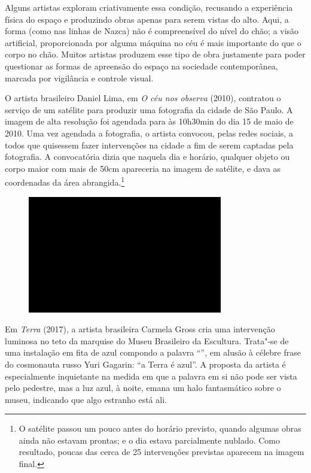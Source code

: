 Alguns artistas exploram criativamente essa condição, recusando a
experiência física do espaço e produzindo obras apenas para serem vistas
do alto. Aqui, a forma (como nas linhas de Nazca) não é compreensível do
nível do chão; a visão artificial, proporcionada por alguma máquina no
céu é mais importante do que o corpo no chão. Muitos artistas produzem
esse tipo de obra justamente para poder questionar as formas de
apreensão do espaço na sociedade contemporânea, marcada por vigilância e
controle visual.

O artista brasileiro Daniel Lima, em \emph{O céu nos observa} (2010),
contratou o serviço de um satélite para produzir uma fotografia da
cidade de São Paulo. A imagem de alta resolução foi agendada para às
10h30min do dia 15 de maio de 2010. Uma vez agendada a fotografia, o
artista convocou, pelas redes sociais, a todos que quisessem fazer
intervenções na cidade a fim de serem captadas pela fotografia. A
convocatória dizia que naquela dia e horário, qualquer objeto ou corpo
maior com mais de 50cm apareceria na imagem de satélite, e dava as
coordenadas da área abrangida.\footnote{O satélite passou um pouco antes
  do horário previsto, quando algumas obras ainda não estavam prontas; e
  o dia estava parcialmente nublado. Como resultado, poucas das cerca de
  25 intervenções previstas aparecem na imagem final.}

\begin{figure}[!ht]
\centering
 \includegraphics[width=85mm]{./imgs/im1.jpg}
\caption{\tiny{}}
\end{figure}

Em \emph{Terra} (2017), a artista brasileira Carmela Gross cria uma
intervenção luminosa no teto da marquise do Museu Brasileiro da
Escultura. Trata"-se de uma instalação em fita de  azul compondo a
palavra ``'', em alusão à célebre frase do cosmonauta russo Yuri
Gagarin: ``a Terra é azul''. A proposta da artista é especialmente
inquietante na medida em que a palavra em si não pode ser vista pelo
pedestre, mas a luz azul, à noite, emana um halo fantasmático sobre o
museu, indicando que algo estranho está ali.

